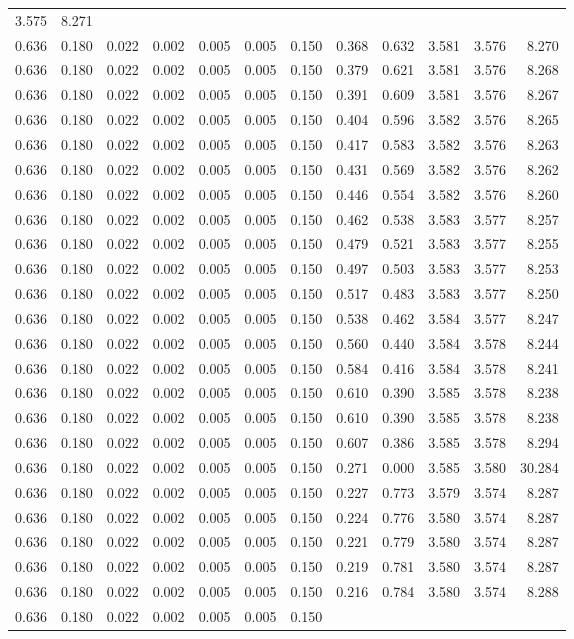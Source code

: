 \begin{longtable}{rrrrrrrrrrrr}
3.575 & 8.271 \\0.636 & 0.180 & 0.022 & 0.002 & 0.005 & 0.005 & 0.150 & 0.368 & 0.632 & 3.581 & 3.576 & 8.270 \\0.636 & 0.180 & 0.022 & 0.002 & 0.005 & 0.005 & 0.150 & 0.379 & 0.621 & 3.581 & 3.576 & 8.268 \\0.636 & 0.180 & 0.022 & 0.002 & 0.005 & 0.005 & 0.150 & 0.391 & 0.609 & 3.581 & 3.576 & 8.267 \\0.636 & 0.180 & 0.022 & 0.002 & 0.005 & 0.005 & 0.150 & 0.404 & 0.596 & 3.582 & 3.576 & 8.265 \\0.636 & 0.180 & 0.022 & 0.002 & 0.005 & 0.005 & 0.150 & 0.417 & 0.583 & 3.582 & 3.576 & 8.263 \\0.636 & 0.180 & 0.022 & 0.002 & 0.005 & 0.005 & 0.150 & 0.431 & 0.569 & 3.582 & 3.576 & 8.262 \\0.636 & 0.180 & 0.022 & 0.002 & 0.005 & 0.005 & 0.150 & 0.446 & 0.554 & 3.582 & 3.576 & 8.260 \\0.636 & 0.180 & 0.022 & 0.002 & 0.005 & 0.005 & 0.150 & 0.462 & 0.538 & 3.583 & 3.577 & 8.257 \\0.636 & 0.180 & 0.022 & 0.002 & 0.005 & 0.005 & 0.150 & 0.479 & 0.521 & 3.583 & 3.577 & 8.255 \\0.636 & 0.180 & 0.022 & 0.002 & 0.005 & 0.005 & 0.150 & 0.497 & 0.503 & 3.583 & 3.577 & 8.253 \\0.636 & 0.180 & 0.022 & 0.002 & 0.005 & 0.005 & 0.150 & 0.517 & 0.483 & 3.583 & 3.577 & 8.250 \\0.636 & 0.180 & 0.022 & 0.002 & 0.005 & 0.005 & 0.150 & 0.538 & 0.462 & 3.584 & 3.577 & 8.247 \\0.636 & 0.180 & 0.022 & 0.002 & 0.005 & 0.005 & 0.150 & 0.560 & 0.440 & 3.584 & 3.578 & 8.244 \\0.636 & 0.180 & 0.022 & 0.002 & 0.005 & 0.005 & 0.150 & 0.584 & 0.416 & 3.584 & 3.578 & 8.241 \\0.636 & 0.180 & 0.022 & 0.002 & 0.005 & 0.005 & 0.150 & 0.610 & 0.390 & 3.585 & 3.578 & 8.238 \\0.636 & 0.180 & 0.022 & 0.002 & 0.005 & 0.005 & 0.150 & 0.610 & 0.390 & 3.585 & 3.578 & 8.238 \\0.636 & 0.180 & 0.022 & 0.002 & 0.005 & 0.005 & 0.150 & 0.607 & 0.386 & 3.585 & 3.578 & 8.294 \\0.636 & 0.180 & 0.022 & 0.002 & 0.005 & 0.005 & 0.150 & 0.271 & 0.000 & 3.585 & 3.580 & 30.284 \\0.636 & 0.180 & 0.022 & 0.002 & 0.005 & 0.005 & 0.150 & 0.227 & 0.773 & 3.579 & 3.574 & 8.287 \\0.636 & 0.180 & 0.022 & 0.002 & 0.005 & 0.005 & 0.150 & 0.224 & 0.776 & 3.580 & 3.574 & 8.287 \\0.636 & 0.180 & 0.022 & 0.002 & 0.005 & 0.005 & 0.150 & 0.221 & 0.779 & 3.580 & 3.574 & 8.287 \\0.636 & 0.180 & 0.022 & 0.002 & 0.005 & 0.005 & 0.150 & 0.219 & 0.781 & 3.580 & 3.574 & 8.287 \\0.636 & 0.180 & 0.022 & 0.002 & 0.005 & 0.005 & 0.150 & 0.216 & 0.784 & 3.580 & 3.574 & 8.288 \\0.636 & 0.180 & 0.022 & 0.002 & 0.005 & 0.005 & 0.150 & 
\end{longtable}
